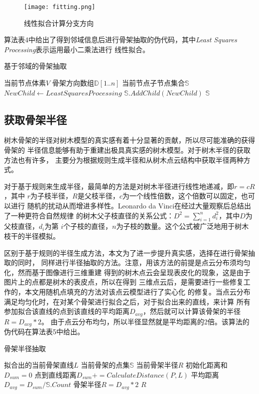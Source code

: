 \begin{figure}[H]
	\centering
	\texttt{[image: fitting.png]}
	\caption{线性拟合计算分支方向}
	\label{fig:fitting}
\end{figure}

算法表4中给出了得到邻域信息后进行骨架抽取的伪代码，其中\textit{Least Squares Processing}表示运用最小二乘法进行
线性拟合。

\begin{algorithm}[H]
	\caption{基于邻域的骨架抽取}
	\begin{algorithmic}[1]
		\Require 当前节点体素$V$
		\Require 骨架方向数组$\mathbb{D}[1..n]$
		\Ensure 当前节点子节点集合$\mathbb{S}$
			\State $NewChild\gets Least Squares Processing$
			\State $\mathbb{S}.AddChild(NewChild)$
		\EndFor
		\State \Return $\mathbb{S}$
	\end{algorithmic}
\end{algorithm}

\subsection{获取骨架半径}
树木骨架的半径对树木模型的真实感有着十分显著的贡献，所以尽可能准确的获得骨架的
半径信息能够有助于重建出极具真实感的树木模型。对于树木半径的获取方法也有许多，
主要分为根据规则生成半径和从树木点云结构中获取半径两种方式。

对于基于规则来生成半径，最简单的方法是对树木半径进行线性地递减，即$r=cR$，其中
$r$为子枝半径，$R$是父枝半径，$c$为一个线性倍数，这个倍数可以固定，也可以进行
随机的扰动从而增进多样性。Leonardo da Vinci在经过大量观察后总结出了一种更符合自然规律
的树木父子枝直径的关系公式：$D^2=\sum_{i=1}^n{d_i^2}$，其中$D$为父枝直径，$d_i$为第
$i$个子枝的直径，$n$为子枝的数量。这个公式被广泛地用于树木枝干的半径模拟。

区别于基于规则的半径生成方法，本文为了进一步提升真实感，选择在进行骨架抽取的同时，
同样进行半径抽取的方法。注意，用该方法的前提是点云分布须均匀化，然而基于图像进行三维重建
得到的树木点云会呈现表皮化的现象，这是由于图片上的点都是树木的表皮点，所以在得到
三维点云后，是需要进行一些修复工作的，本文用随机点填充的方法对该点云模型进行了实心化
的修复。当点云分布满足均匀化时，在对某个骨架进行拟合之后，对于拟合出来的直线，来计算
所有参加拟合该直线的点到该直线的平均距离$D_{avg}$，然后就可以计算该骨架的半径$R=D_{avg}*2$。
由于点云分布均匀，所以半径显然就是平均距离的2倍。该算法的伪代码在算法表5中给出。\\

\begin{algorithm}[H]
	\caption{骨架半径抽取}
	\begin{algorithmic}[1]
		\Require 拟合出的当前骨架直线$L$
		\Require 当前骨架的点集$\mathbb{S}$
		\Ensure 当前骨架半径$R$
		\State 初始化距离和$D_{sum}=0$
		\State 点到直线距离$D_{sum}+=CalculateDistance(P, L)$
		\EndFor
		\State 平均距离$D_{avg}=D_{sum}/\mathbb{S}.Count$
		\State 骨架半径$R=D_{avg}*2$
		\State \Return $R$
	\end{algorithmic}
\end{algorithm}


